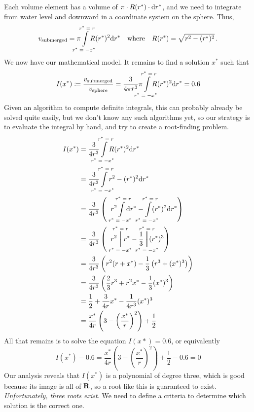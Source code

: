 \documentclass[12pt]{article}
\begin{document}
Each volume element has a volume of $\pi \cdot R(r^*) \cdot \mathrm{d} r^*$,
and we need to integrate from water level and downward in a
coordinate system on the sphere.
Thus,
\begin{equation}
    v_\text{submerged} =
        \pi \int\limits_{\mathclap{r^* = -x^*}}^{\mathclap{r^* = r}}R(r^*)^2 \D r^*
    \quad\text{where}\quad R(r^*) = \sqrt{r^2 - (r^*)^2} \,\text.
\end{equation}
We now have our mathematical model.
It remains to find a solution $x^*$ such that
\[
    I(x^*) \coloneqq \frac{v_\text{submerged}}{v_\text{sphere}}
    = \frac{3}{4 \pi r^3}
        \pi \int\limits_{\mathclap{r^* = -x^*}}^{\mathclap{r^* = r}}R(r^*)^2 \D r^*
    = 0.6
\]
Given an algorithm to compute definite integrals, this can probably already be
solved quite easily, but we don't know any such algorithms yet,
so our strategy is to evaluate the integral by hand, and try
to create a root-finding problem.
\begin{align*}
    I(x^*) &= \frac{3}{4 r^3}
        \int\limits_{\mathclap{r^* = -x^*}}^{\mathclap{r^* = r}}R(r^*)^2 \D r^* \\
    &= \frac{3}{4 r^3}
        \int\limits_{\mathclap{r^* = -x^*}}^{\mathclap{r^* = r}}
            r^2 - (r^*)^2 \D r^* \\
    &= \frac{3}{4 r^3} \left(\;\; %
        r^2\int\limits_{\mathclap{r^* = -x^*}}^{\mathclap{r^* = r}}
            \D r^*
            -
        \int\limits_{\mathclap{r^* = -x^*}}^{\mathclap{r^* = r}}
            (r^*)^2\D r^*
    \right) \\
    &= \frac{3}{4 r^3} \left(\;\; %
    r^2\Sub\limits_{\mathclap{r^* = -x^*}}^{\mathclap{r^* = r}}r^*
    -
    \frac{1}{3}\Sub\limits_{\mathclap{r^* = -x^*}}^{\mathclap{r^* = r}}
        (r^*)^3
    \right) \\
    &= \frac{3}{4 r^3} \left(
    r^2(r + x^*) - \frac{1}{3}\left(r^3 + (x^*)^3\right)
    \right) \\
    &= \frac{3}{4 r^3} \left(
    \frac{2}{3} r^3 + r^2x^* - \frac{1}{3}(x^*)^3
    \right) \\
    &= \frac{1}{2} + \frac{3}{4r}x^* - \frac{1}{4 r^3} (x^*)^3 \\
    &= \frac{x^*}{4r} \left(
    3 - \left(\frac{x^*}{r}\right)^2
    \right) + \frac{1}{2}
\end{align*}
All that remains is to solve the equation $I(x*) = 0.6$,
or equivalently
\[
    I(x^*) - 0.6 = \frac{x^*}{4r} \left(
    3 - \left(\frac{x^*}{r}\right)^2
    \right) + \frac{1}{2} - 0.6 = 0
\]
Our analysis reveals that $I(x^*)$ is a polynomial of degree three,
which is good because its image is all of $\mathbf{R}$, so a root like this is guaranteed
to exist. {\em Unfortunately, three roots exist.}
We need to define a criteria to determine which solution is the correct one.
\end{document}
